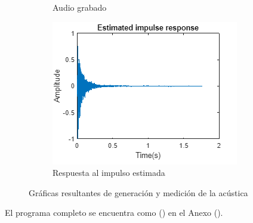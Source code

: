 \begin{figure}[!htb]
\begin{subfigure}{0.3\textwidth}
        \caption{\footnotesize Audio grabado}
        \label{fig:sub2}
    \end{subfigure}
    \hfill
    \begin{subfigure}{0.3\textwidth}
        \centering
        \includegraphics[width=\linewidth]{imagenes/EstimatedImpulseResponse_RIR_Measurement.png}
        \caption{\footnotesize Respuesta al impulso estimada}
        \label{fig:sub2}
    \end{subfigure}
    \caption{Gráficas resultantes de generación y medición de la acústica}
\end{figure}
\FloatBarrier

El programa completo se encuentra como () en el Anexo ().

